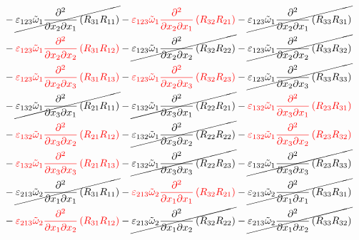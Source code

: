 \begin{equation}
	\begin{split}
&		-\cancel{\varepsilon_{123}\tilde{\omega}_{1}\pdv{}{x_{2}}{x_{1}}\left(R_{31}R_{11}\right)}
		-{\color{red}\varepsilon_{123}\tilde{\omega}_{1}\pdv{}{x_{2}}{x_{1}}\left(R_{32}R_{21}\right)}
		-\cancel{\varepsilon_{123}\tilde{\omega}_{1}\pdv{}{x_{2}}{x_{1}}\left(R_{33}R_{31}\right)}\\
&		-{\color{red}\varepsilon_{123}\tilde{\omega}_{1}\pdv{}{x_{2}}{x_{2}}\left(R_{31}R_{12}\right)}
		-\cancel{\varepsilon_{123}\tilde{\omega}_{1}\pdv{}{x_{2}}{x_{2}}\left(R_{32}R_{22}\right)}
		-\cancel{\varepsilon_{123}\tilde{\omega}_{1}\pdv{}{x_{2}}{x_{2}}\left(R_{33}R_{32}\right)}\\
&		-{\color{red}\varepsilon_{123}\tilde{\omega}_{1}\pdv{}{x_{2}}{x_{3}}\left(R_{31}R_{13}\right)}
		-{\color{red}\varepsilon_{123}\tilde{\omega}_{1}\pdv{}{x_{2}}{x_{3}}\left(R_{32}R_{23}\right)}
		-\cancel{\varepsilon_{123}\tilde{\omega}_{1}\pdv{}{x_{2}}{x_{3}}\left(R_{33}R_{33}\right)}\\
&		-\cancel{\varepsilon_{132}\tilde{\omega}_{1}\pdv{}{x_{3}}{x_{1}}\left(R_{21}R_{11}\right)}
		-\cancel{\varepsilon_{132}\tilde{\omega}_{1}\pdv{}{x_{3}}{x_{1}}\left(R_{22}R_{21}\right)}
		-{\color{red}\varepsilon_{132}\tilde{\omega}_{1}\pdv{}{x_{3}}{x_{1}}\left(R_{23}R_{31}\right)}\\
&		-{\color{red}\varepsilon_{132}\tilde{\omega}_{1}\pdv{}{x_{3}}{x_{2}}\left(R_{21}R_{12}\right)}
		-\cancel{\varepsilon_{132}\tilde{\omega}_{1}\pdv{}{x_{3}}{x_{2}}\left(R_{22}R_{22}\right)}
		-{\color{red}\varepsilon_{132}\tilde{\omega}_{1}\pdv{}{x_{3}}{x_{2}}\left(R_{23}R_{32}\right)}\\
&		-{\color{red}\varepsilon_{132}\tilde{\omega}_{1}\pdv{}{x_{3}}{x_{3}}\left(R_{21}R_{13}\right)}
		-\cancel{\varepsilon_{132}\tilde{\omega}_{1}\pdv{}{x_{3}}{x_{3}}\left(R_{22}R_{23}\right)}
		-\cancel{\varepsilon_{132}\tilde{\omega}_{1}\pdv{}{x_{3}}{x_{3}}\left(R_{23}R_{33}\right)}\\
&		-\cancel{\varepsilon_{213}\tilde{\omega}_{2}\pdv{}{x_{1}}{x_{1}}\left(R_{31}R_{11}\right)}
		-{\color{red}\varepsilon_{213}\tilde{\omega}_{2}\pdv{}{x_{1}}{x_{1}}\left(R_{32}R_{21}\right)}
		-\cancel{\varepsilon_{213}\tilde{\omega}_{2}\pdv{}{x_{1}}{x_{1}}\left(R_{33}R_{31}\right)}\\
&		-{\color{red}\varepsilon_{213}\tilde{\omega}_{2}\pdv{}{x_{1}}{x_{2}}\left(R_{31}R_{12}\right)}
		-\cancel{\varepsilon_{213}\tilde{\omega}_{2}\pdv{}{x_{1}}{x_{2}}\left(R_{32}R_{22}\right)}
		-\cancel{\varepsilon_{213}\tilde{\omega}_{2}\pdv{}{x_{1}}{x_{2}}\left(R_{33}R_{32}\right)}\\

\end{split}
\end{equation}
